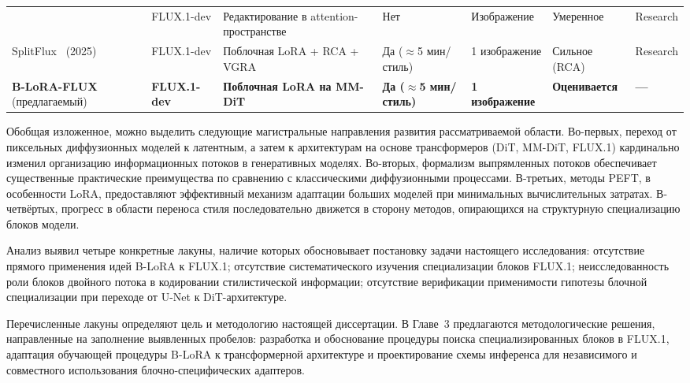 \begin{landscape}
\begin{table}[p]
\begin{tabular}{p{2.8cm} p{2.2cm} p{4.5cm} p{2.5cm} p{2.0cm} p{2.5cm} p{2.0cm}}
  & FLUX.1-dev
  & Редактирование в attention-пространстве
  & Нет
  & Изображение
  & Умеренное
  & Research \\
\addlinespace
SplitFlux~\cite{yang2025splitflux} (2025)
  & FLUX.1-dev
  & Поблочная LoRA + RCA + VGRA
  & Да (${\approx}$5 мин/стиль)
  & 1 изображение
  & Сильное (RCA)
  & Research \\
\midrule
\textbf{B-LoRA-FLUX} (предлагаемый)
  & \textbf{FLUX.1-dev}
  & \textbf{Поблочная LoRA на MM-DiT}
  & \textbf{Да (${\approx}$5 мин/стиль)}
  & \textbf{1 изображение}
  & \textbf{Оценивается}
  & \textbf{---} \\
\bottomrule
\end{tabular}
\end{table}
\end{landscape}

Обобщая изложенное, можно выделить следующие магистральные направления развития рассматриваемой области. Во-первых, переход от пиксельных диффузионных моделей к латентным, а затем к архитектурам на основе трансформеров (DiT, MM-DiT, FLUX.1) кардинально изменил организацию информационных потоков в генеративных моделях. Во-вторых, формализм выпрямленных потоков обеспечивает существенные практические преимущества по сравнению с классическими диффузионными процессами. В-третьих, методы PEFT, в особенности LoRA, предоставляют эффективный механизм адаптации больших моделей при минимальных вычислительных затратах. В-четвёртых, прогресс в области переноса стиля последовательно движется в сторону методов, опирающихся на структурную специализацию блоков модели.

Анализ выявил четыре конкретные лакуны, наличие которых обосновывает постановку задачи настоящего исследования: отсутствие прямого применения идей B-LoRA к FLUX.1; отсутствие систематического изучения специализации блоков FLUX.1; неисследованность роли блоков двойного потока в кодировании стилистической информации; отсутствие верификации применимости гипотезы блочной специализации при переходе от U-Net к DiT-архитектуре.

Перечисленные лакуны определяют цель и методологию настоящей диссертации. В Главе~3 предлагаются методологические решения, направленные на заполнение выявленных пробелов: разработка и обоснование процедуры поиска специализированных блоков в FLUX.1, адаптация обучающей процедуры B-LoRA к трансформерной архитектуре и проектирование схемы инференса для независимого и совместного использования блочно-специфических адаптеров.
